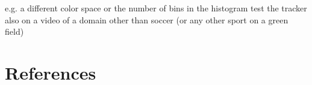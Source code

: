 \documentclass[a4paper,11pt]{article}
\begin{document}
e.g. a different color space or the number of bins in the histogram
test the tracker also on a video of a domain other than soccer (or any other sport on a green field)





\section{References} 


% 
% 
\end{document}
